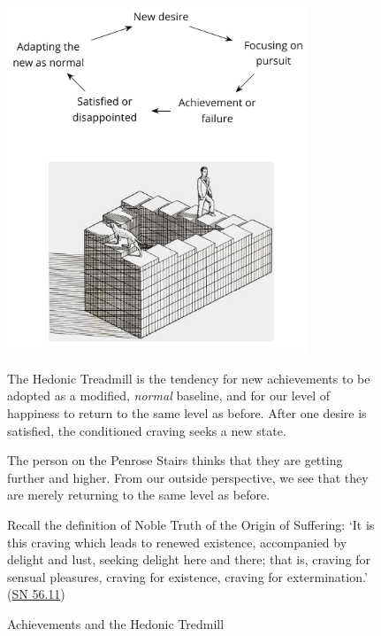\begin{figure}[h]
\vspace*{-15pt}
\caption{Achievements and the Hedonic Tredmill}\label{fig-hedonic-treadmill}

\centering

\includegraphics[width=90mm]{./manuscript/tex/diagrams/hedonic-treadmill-stairs.pdf}

\bigskip

\begin{minipage}{0.8\linewidth}
\centering\footnotesize

The Hedonic Treadmill is the tendency for new achievements to be adopted as a modified, \emph{normal} baseline,
and for our level of happiness to return to the same level as before.
After one desire is satisfied, the conditioned craving seeks a new state.

\bigskip

The person on the Penrose Stairs thinks that
they are getting further and higher.
From our outside perspective,
we see that they are merely returning to the same level as before.

\bigskip

Recall the definition of Noble Truth of the Origin of Suffering:
`It is this craving which leads to renewed existence,
 accompanied by delight and lust, seeking delight here and there;
 that is, craving for sensual pleasures, craving for existence,
 craving for extermination.'
(\href{https://suttacentral.net/sn56.11/en/bodhi}{SN 56.11})

\end{minipage}

\end{figure}


